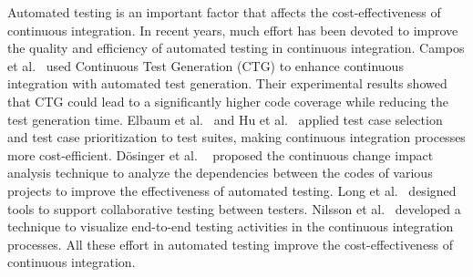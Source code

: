 Automated testing is an important factor that affects the cost-effectiveness of continuous integration. In recent years, much effort has been devoted to improve the quality and efficiency of automated testing in continuous integration. Campos et al.~\cite{campos2014continuous} used Continuous Test Generation (CTG) to enhance continuous integration with automated test generation. Their experimental results showed that CTG could lead to a significantly higher code coverage while reducing the test generation time. Elbaum et al.~\cite{elbaum2014techniques} and Hu et al.~\cite{hu2016Implementation} applied test case selection and test case prioritization to test suites, making continuous integration processes more cost-efficient. D{\"o}singer et al. ~\cite{dosinger2012communicating} proposed the continuous change impact analysis technique to analyze the dependencies between the codes of various projects to improve the effectiveness of automated testing. Long et al.~\cite{long2015collaborative} designed tools to support collaborative testing between testers. Nilsson et al.~\cite{nilsson2014visualizing} developed a technique to visualize end-to-end testing activities in the continuous integration processes. All these effort in automated testing improve the cost-effectiveness of continuous integration. 